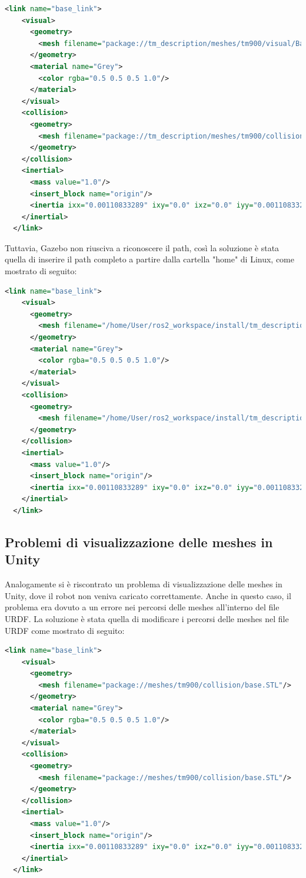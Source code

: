 \documentclass[11pt]{report}
\begin{document}
\begin{lstlisting}[language=xml, breaklines=true]
    <link name="base_link">
    <visual>
      <geometry>
        <mesh filename="package://tm_description/meshes/tm900/visual/Base.STL"/>
      </geometry>
      <material name="Grey">
        <color rgba="0.5 0.5 0.5 1.0"/>
      </material>
    </visual>
    <collision>
      <geometry>
        <mesh filename="package://tm_description/meshes/tm900/collision/base.STL"/>
      </geometry>
    </collision>
    <inertial>
      <mass value="1.0"/>
      <insert_block name="origin"/>
      <inertia ixx="0.00110833289" ixy="0.0" ixz="0.0" iyy="0.00110833289" iyz="0.0" izz="0.0018"/>
    </inertial>
  </link>
\end{lstlisting}

Tuttavia, Gazebo non riusciva a riconoscere il path, così la soluzione è stata quella di inserire il path completo a partire dalla cartella "home" di Linux, come mostrato di seguito:

\begin{lstlisting}[language=xml, breaklines=true]
    <link name="base_link">
    <visual>
      <geometry>
        <mesh filename="/home/User/ros2_workspace/install/tm_description/share/tm_description/meshes/tm900/visual/Base.STL"/>
      </geometry>
      <material name="Grey">
        <color rgba="0.5 0.5 0.5 1.0"/>
      </material>
    </visual>
    <collision>
      <geometry>
        <mesh filename="/home/User/ros2_workspace/install/tm_description/share/tm_description/meshes/tm900/collision/base.STL"/>
      </geometry>
    </collision>
    <inertial>
      <mass value="1.0"/>
      <insert_block name="origin"/>
      <inertia ixx="0.00110833289" ixy="0.0" ixz="0.0" iyy="0.00110833289" iyz="0.0" izz="0.0018"/>
    </inertial>
  </link>
\end{lstlisting}
\subsection{Problemi di visualizzazione delle meshes in Unity}
Analogamente si è riscontrato un problema di visualizzazione delle meshes in Unity, dove il robot non veniva caricato correttamente. Anche in questo caso, il problema era dovuto a un errore nei percorsi delle meshes all'interno del file URDF. La soluzione è stata quella di modificare i percorsi delle meshes nel file URDF come mostrato di seguito:

\begin{lstlisting}[language=xml, breaklines=true]
    <link name="base_link">
    <visual>
      <geometry>
        <mesh filename="package://meshes/tm900/collision/base.STL"/>
      </geometry>
      <material name="Grey">
        <color rgba="0.5 0.5 0.5 1.0"/>
      </material>
    </visual>
    <collision>
      <geometry>
        <mesh filename="package://meshes/tm900/collision/base.STL"/>
      </geometry>
    </collision>
    <inertial>
      <mass value="1.0"/>
      <insert_block name="origin"/>
      <inertia ixx="0.00110833289" ixy="0.0" ixz="0.0" iyy="0.00110833289" iyz="0.0" izz="0.0018"/>
    </inertial>
  </link>
\end{lstlisting}
\end{document}
